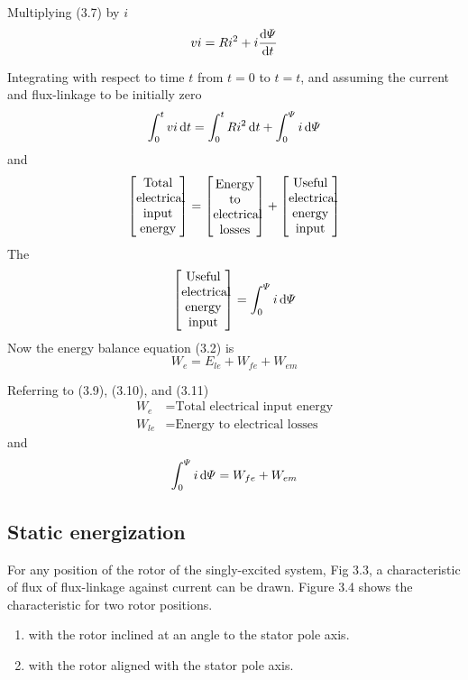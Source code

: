 \documentclass[a4paper,numbers=noenddot,12pt]{scrbook}
\begin{document}
Multiplying (3.7) by $i$
\begin{equation}
    vi = Ri^2 + i \dfrac{\dif \varPsi}{\dif t}
    \label{eq:Eq3.8}
\end{equation}

Integrating with respect to time $t$ from $t = 0$ to $t = t$, and assuming the current and flux-linkage to be initially zero
\begin{equation}
    \int_0^t vi \dif t = \int_0^t Ri^2 \dif t + \int_0^{\varPsi} i \dif \varPsi
    \label{eq:Eq3.9}
\end{equation}
and
\begin{equation}
     \left[
        \parbox{8ex}{\centering Total \\ electrical \\ input \\ energy}
    \right]
    =
    \left[
        \parbox{8ex}{\centering Energy \\ to \\ electrical \\ losses}
    \right]
    +
    \left[
        \parbox{8ex}{\centering Useful \\ electrical \\ energy \\ input}
    \right]
    \label{eq:Eq3.10}
\end{equation}
The
\begin{equation}
    \left[
        \parbox{8ex}{\centering Useful \\ electrical \\ energy \\ input}
    \right]
    =
    \int_0^{\varPsi} i \dif \varPsi
    \label{eq:Eq3.11}
\end{equation}
Now the energy balance equation (3.2) is
\begin{equation*}
    W_e = E_{le} + W_{fe} + W_{em}
\end{equation*}

Referring to (3.9), (3.10), and (3.11)
\begin{align*}
    W_e & = \text{Total electrical input energy}\\
    W_{le} & = \text{Energy to electrical losses}
\end{align*}
and
\begin{equation}
    \int_0^{\varPsi} i \dif \varPsi = W_{fe} + W_{em}
    \label{eq:Eq3.12}
\end{equation}

\subsection{Static energization} For any position of the rotor of the singly-excited system, Fig 3.3, a characteristic of flux of flux-linkage against current can be drawn. Figure 3.4 shows the characteristic for two rotor positions.
\begin{enumerate}[label={Position \Alph*:},leftmargin=3cm]
    \item with the rotor inclined at an angle to the stator pole axis.
    \item with the rotor aligned with the stator pole axis.
\end{enumerate}
\end{document}

